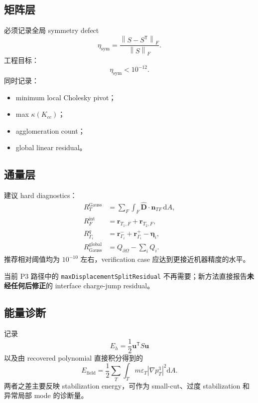 \documentclass[UTF8,a4paper,11pt]{ctexart}
\newcommand{\dd}{\mathrm{d}}
\newcommand{\eps}{\varepsilon}
\newcommand{\vct}[1]{\bm{#1}}
\newcommand{\T}{\mathsf{T}}
\newcommand{\norm}[1]{\left\lVert #1\right\rVert}
\begin{document}
\subsection{矩阵层}

必须记录全局 symmetry defect
\begin{equation}
\eta_{\mathrm{sym}}
=\frac{\norm{S-S^{\T}}_F}{\norm S_F}.
\label{eq:symmetry_defect}
\end{equation}
工程目标：
\[
\eta_{\mathrm{sym}}<10^{-12}.
\]
同时记录：
\begin{itemize}
  \item minimum local Cholesky pivot；
  \item max \(\kappa(K_{cc})\)；
  \item agglomeration count；
  \item global linear residual。
\end{itemize}

\subsection{通量层}

建议 hard diagnostics：
\begin{align}
R_{T}^{\mathrm{Gauss}}
&=\sum_F\int_F\widehat{\vct D}\cdot\vct n_{TF}\,\dd A,\\
R_{F}^{\mathrm{int}}
&=\vct r_{T_1,F}+\vct r_{T_2,F},\\
R_{\Gamma_i}^{q}
&=\vct r^-_{\Gamma_i}+\vct r^+_{\Gamma_i}-\vct\eta_i,\\
R^{\mathrm{global}}_{\mathrm{Gauss}}
&=Q_{\partial\Omega}-\sum_iQ_i.
\end{align}
推荐相对阈值均为 \(10^{-10}\) 左右，verification case 应达到更接近机器精度的水平。

当前 P3 路径中的 \texttt{maxDisplacementSplitResidual} 不再需要；新方法直接报告\textbf{未经任何后修正}的 interface charge-jump residual。

\subsection{能量诊断}

记录
\begin{equation}
E_h=\frac12\vct u^{\T}S\vct u
\label{eq:energy_diag}
\end{equation}
以及由 recovered polynomial 直接积分得到的
\[
E_{\mathrm{field}}
=\frac12\sum_T\int_Tm\eps_T|\nabla p_T^3|^2\dd A.
\]
两者之差主要反映 stabilization energy，可作为 small-cut、过度 stabilization 和异常局部 mode 的诊断量。
\end{document}
